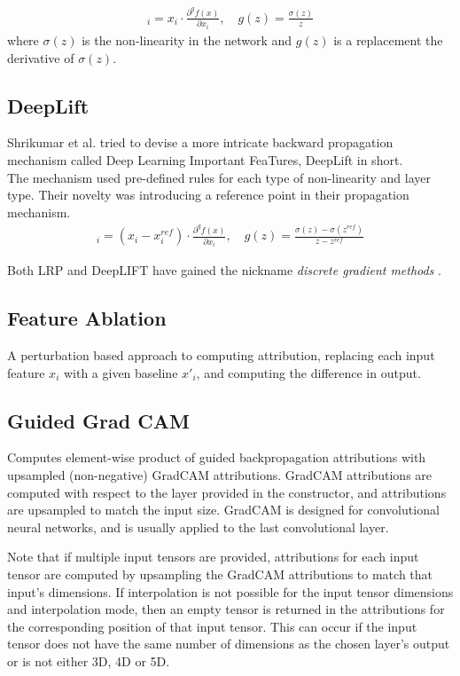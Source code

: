 \documentclass[12pt]{report}
\begin{document}
\begin{align*}
	[E_\text{LRP}(f, x)]_i  =  x_i \cdot \frac{\partial^{g}f(x)}{\partial x_i}, \quad g(z) = \frac{\sigma(z)}{z}
\end{align*}
where $\sigma(z)$ is the non-linearity in the network and $g(z)$ is a replacement the derivative of $\sigma(z)$.
	
\subsection{DeepLift}
Shrikumar et al. \cite{DBLP:journals/corr/ShrikumarGK17} tried to devise a more intricate backward propagation mechanism called Deep Learning Important FeaTures, DeepLift in short. \\

The mechanism used pre-defined rules for each type of non-linearity and layer type. Their novelty was introducing a reference point in their propagation mechanism.  
\begin{align*}
	[E_\text{DeepLift}(f, x)]_i  =  (x_i-x_i^{ref}) \cdot \frac{\partial^{g}f(x)}{\partial x_i}, \quad g(z) = \frac{\sigma(z)-\sigma(z^{ref})}{z-z^{ref}}
\end{align*}

Both LRP and DeepLIFT have gained the nickname  \textit{discrete gradient methods} \cite{DBLP:journals/corr/abs-2012-14261}.

\subsection{Feature Ablation}
   A perturbation based approach to computing attribution, replacing each input feature $x_i$ with a given baseline $x'_i$, and computing the difference in output. 
   
\subsection{Guided Grad CAM}
Computes element-wise product of guided backpropagation attributions with upsampled (non-negative) GradCAM attributions. GradCAM attributions are computed with respect to the layer provided in the constructor, and attributions are upsampled to match the input size. GradCAM is designed for convolutional neural networks, and is usually applied to the last convolutional layer.

Note that if multiple input tensors are provided, attributions for each input tensor are computed by upsampling the GradCAM attributions to match that input’s dimensions. If interpolation is not possible for the input tensor dimensions and interpolation mode, then an empty tensor is returned in the attributions for the corresponding position of that input tensor. This can occur if the input tensor does not have the same number of dimensions as the chosen layer’s output or is not either 3D, 4D or 5D.
\end{document}
